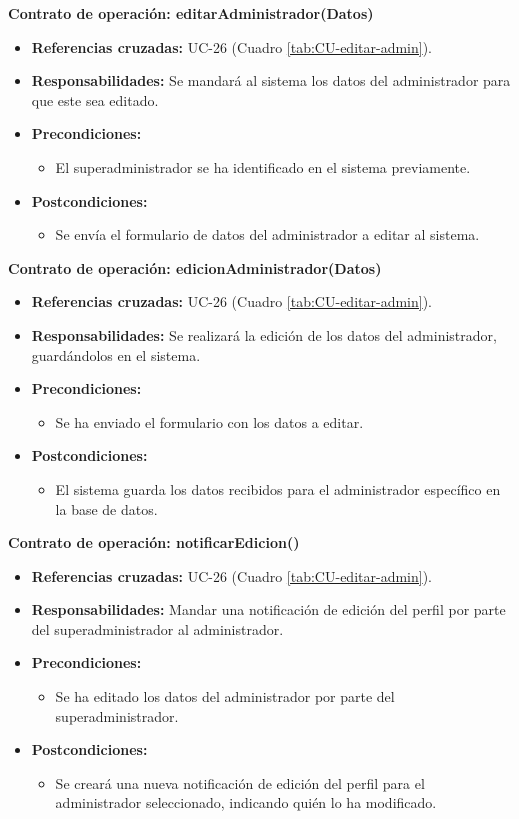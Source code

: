 \textbf{Contrato de operación: editarAdministrador(Datos)}
\begin{itemize}
\item \textbf{Referencias cruzadas:} UC-26 (Cuadro \ref{tab:CU-editar-admin}).
\item \textbf{Responsabilidades:} Se mandará al sistema los datos del administrador para que este sea editado.
\item \textbf{Precondiciones:} 
 \begin{itemize}
\item El superadministrador se ha identificado en el sistema previamente.
\end {itemize}
\item \textbf{Postcondiciones:} 
 \begin{itemize}
\item Se envía el formulario de datos del administrador a editar al sistema.
\end {itemize}
\end {itemize}

\textbf{Contrato de operación: edicionAdministrador(Datos)}
\begin{itemize}
\item \textbf{Referencias cruzadas:} UC-26 (Cuadro \ref{tab:CU-editar-admin}).
\item \textbf{Responsabilidades:} Se realizará la edición de los datos del administrador, guardándolos en el sistema.
\item \textbf{Precondiciones:} 
 \begin{itemize}
\item Se ha enviado el formulario con los datos a editar.
\end {itemize}
\item \textbf{Postcondiciones:} 
 \begin{itemize}
\item El sistema guarda los datos recibidos para el administrador específico en la base de datos.
\end {itemize}
\end {itemize}

\textbf{Contrato de operación: notificarEdicion()}
\begin{itemize}
\item \textbf{Referencias cruzadas:} UC-26 (Cuadro \ref{tab:CU-editar-admin}).
\item \textbf{Responsabilidades:} Mandar una notificación de edición del perfil por parte del superadministrador al administrador.
\item \textbf{Precondiciones:} 
 \begin{itemize}
\item Se ha editado los datos del administrador por parte del superadministrador.
\end {itemize}
\item \textbf{Postcondiciones:} 
 \begin{itemize}
\item Se creará una nueva notificación de edición del perfil para el administrador seleccionado, indicando quién lo ha modificado.
\end {itemize}
\end {itemize}

